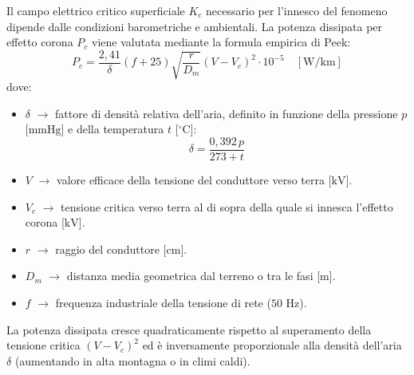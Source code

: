 Il campo elettrico critico superficiale $K_c$ necessario per l'innesco del fenomeno dipende dalle condizioni barometriche e ambientali. La potenza dissipata per effetto corona $P_c$ viene valutata mediante la formula empirica di Peek:
\[P_c = \frac{2{,}41}{\delta} (f + 25) \sqrt{\frac{r}{D_m}} (V - V_c)^2 \cdot 10^{-5} \quad [\text{W/km}]\]
dove:
\begin{itemize}
    \item \textbf{$\delta$} $\rightarrow$ fattore di densità relativa dell'aria, definito in funzione della pressione $p$ [$\text{mmHg}$] e della temperatura $t$ [$^\circ\text{C}$]:
    \[\delta = \frac{0{,}392 \, p}{273 + t}\]
    \item \textbf{$V$} $\rightarrow$ valore efficace della tensione del conduttore verso terra [$\text{kV}$].
    \item \textbf{$V_c$} $\rightarrow$ tensione critica verso terra al di sopra della quale si innesca l'effetto corona [$\text{kV}$].
    \item \textbf{$r$} $\rightarrow$ raggio del conduttore [$\text{cm}$].
    \item \textbf{$D_m$} $\rightarrow$ distanza media geometrica dal terreno o tra le fasi [$\text{m}$].
    \item \textbf{$f$} $\rightarrow$ frequenza industriale della tensione di rete ($50\text{ Hz}$).
\end{itemize}

La potenza dissipata cresce quadraticamente rispetto al superamento della tensione critica $(V - V_c)^2$ ed è inversamente proporzionale alla densità dell'aria $\delta$ (aumentando in alta montagna o in climi caldi).

